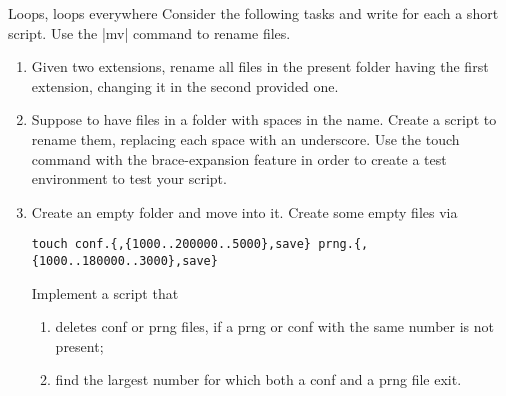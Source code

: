 
\begin{exercise}[Instructive]{Loops, loops everywhere}
    Consider the following tasks and write for each a short script.
    Use the \bash|mv| command to rename files.
    \begin{enumerate}[itemsep=-2pt, after=\vspace{-0.6\baselineskip}]
        \item Given two extensions, rename all files in the present folder having the first extension, changing it in the second provided one.
        \item Suppose to have files in a folder with spaces in the name.
              Create a script to rename them, replacing each space with an underscore.
              Use the touch command with the brace-expansion feature in order to create a test environment to test your script.
        \item Create an empty folder and move into it.
              Create some empty files via
              \begin{lstlisting}[style=MyBash, numbers=none]
                  touch conf.{,{1000..200000..5000},save} prng.{,{1000..180000..3000},save}
              \end{lstlisting}
              Implement a script that
              \begin{enumerate}[nosep, after=\vspace{-0.6\baselineskip}]
                  \item deletes conf or prng files, if a prng or conf with the same number is not present;
                  \item find the largest number for which both a conf and a prng file exit.
              \end{enumerate}
    \end{enumerate}
    \bigskip
\end{exercise}
